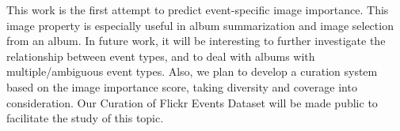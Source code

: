 \documentclass[10pt,twocolumn,letterpaper]{article}
\begin{document}
This work is the first attempt to predict event-specific image importance. This image property is especially useful in album summarization and image selection from an album. In future work, it will be interesting to further investigate the relationship between event types, and to deal with albums with multiple/ambiguous event types.  Also, we plan to develop a curation system based on the image importance score, taking diversity and coverage into consideration. Our  Curation of Flickr Events Dataset will be made public to facilitate the study of this topic.
{\small


}
\end{document}
